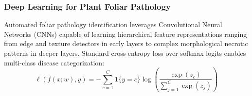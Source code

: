 \documentclass[applsci,article,submit,oneauthor,pdftex]{Definitions/mdpi}
\begin{document}
\subsubsection{Deep Learning for Plant Foliar Pathology}
Automated foliar pathology identification leverages Convolutional Neural Networks (CNNs) capable of learning hierarchical feature representations ranging from edge and texture detectors in early layers to complex morphological necrotic patterns in deeper layers. Standard cross-entropy loss over softmax logits enables multi-class disease categorization:
\begin{equation}
\ell(f(x; w), y) = -\sum_{c=1}^{C} \mathbf{1}\{y = c\} \log \left( \frac{\exp(z_c)}{\sum_{j=1}^C \exp(z_j)} \right)
\label{eq:cross_entropy}
\end{equation}
\end{document}
